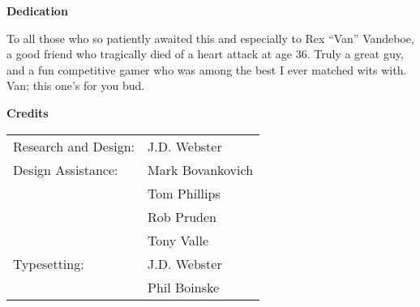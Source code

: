 \thispagestyle{empty}



\begin{center}
\textbf{\Large {} Dedication}
\end{center}

To all those who so patiently awaited this and especially to Rex “Van” Vandeboe, a good friend who tragically died of a heart attack at age 36. Truly a great guy, and a fun competitive gamer who was among the best I ever matched wits with. Van; this one’s for you bud.

\begin{center}
\textbf{\Large {} Credits}
\end{center}

\begin{tabularx}{\linewidth}{@{}LL@{}}
Research and Design: &J.D. Webster\\
Design Assistance:   &Mark Bovankovich\\
                     &Tom Phillips\\
                     &Rob Pruden\\
                     &Tony Valle\\
Typesetting:         &J.D. Webster\\
                     &Phil Boinske\\
\end{tabularx}

